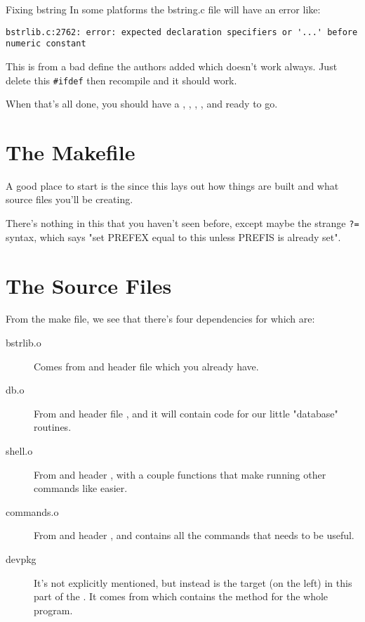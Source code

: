 \begin{aside}{Fixing bstring}
In some platforms the bstring.c file will have an error like:

\verb|bstrlib.c:2762: error: expected declaration specifiers or '...' before numeric constant|

This is from a bad define the authors added which doesn't work always.  Just
delete this \verb|#ifdef| then recompile and it should work.
\end{aside}

When that's all done, you should have a , ,
, , and  ready to go.

\section{The Makefile}

A good place to start is the  since this lays out 
how things are built and what source files you'll be creating.


There's nothing in this that you haven't seen before, except maybe the strange
\verb|?=| syntax, which says "set PREFEX equal to this unless PREFIS is already
set".

\section{The Source Files}

From the make file, we see that there's four dependencies for 
which are:

\begin{description}
\item[bstrlib.o] Comes from  and header file  which
    you already have.
\item[db.o] From  and header file , and it
    will contain code for our little "database" routines.
\item[shell.o] From  and header , with a couple
    functions that make running other commands like  easier.
\item[commands.o] From  and header , and
    contains all the commands that  needs to be useful.
\item[devpkg] It's not explicitly mentioned, but instead is the target
    (on the left) in this part of the . It comes from
     which contains the  method for the whole
    program.
\end{description}

